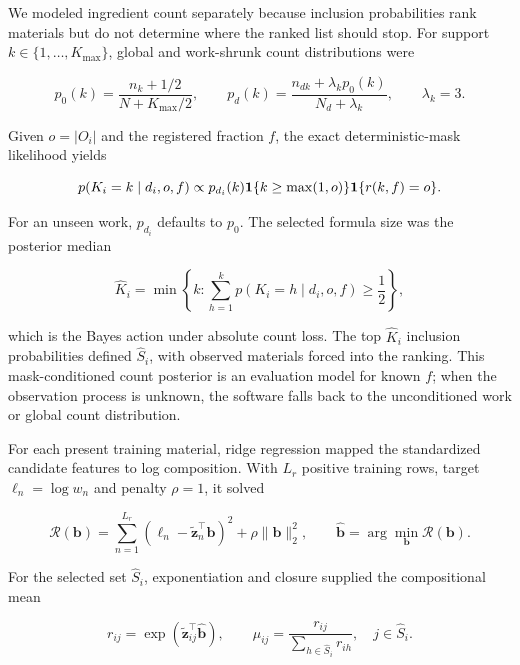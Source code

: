\documentclass[11pt]{article}
\begin{document}
We modeled ingredient count separately because inclusion probabilities rank materials but do not determine where the ranked list should stop. For support \(k\in\{1,\ldots,K_{\max}\}\), global and work-shrunk count distributions were

\begin{equation}
\label{eq:count-priors}
p_0(k)=\frac{n_k+1/2}{N+K_{\max}/2},\qquad p_d(k)=\frac{n_{dk}+\lambda_k p_0(k)}{N_d+\lambda_k},\qquad \lambda_k=3.
\end{equation}

Given \(o=|O_i|\) and the registered fraction \(f\), the exact deterministic-mask likelihood yields

\begin{equation}
\label{eq:count-posterior}
p(K_i=k\mid d_i,o,f)\propto p_{d_i}(k){\bf1}\{k\ge\max(1,o)\}{\bf1}\{r(k,f)=o\}.
\end{equation}

For an unseen work, \(p_{d_i}\) defaults to \(p_0\). The selected formula size was the posterior median

\begin{equation}
\label{eq:count-decision}
\widehat K_i=\min\left\{k:\sum_{h=1}^{k}p(K_i=h\mid d_i,o,f)\ge\frac{1}{2}\right\},
\end{equation}

which is the Bayes action under absolute count loss. The top \(\widehat K_i\) inclusion probabilities defined \(\widehat S_i\), with observed materials forced into the ranking. This mask-conditioned count posterior is an evaluation model for known \(f\); when the observation process is unknown, the software falls back to the unconditioned work or global count distribution.

For each present training material, ridge regression mapped the standardized candidate features to log composition. With \(L_r\) positive training rows, target \(\ell_n=\log w_n\) and penalty \(\rho=1\), it solved

\begin{equation}
\label{eq:ratio-ridge}
\mathcal R(\mathbf b)=\sum_{n=1}^{L_r}(\ell_n-\widetilde{\mathbf z}_n^{\top}\mathbf b)^2+\rho\|\mathbf b\|_2^2,\qquad \widehat{\mathbf b}=\arg\min_{\mathbf b}\mathcal R(\mathbf b).
\end{equation}

For the selected set \(\widehat S_i\), exponentiation and closure supplied the compositional mean

\begin{equation}
\label{eq:ratio-closure}
r_{ij}=\exp(\widetilde{\mathbf z}_{ij}^{\top}\widehat{\mathbf b}),\qquad \mu_{ij}=\frac{r_{ij}}{\sum_{h\in\widehat S_i}r_{ih}},\quad j\in\widehat S_i.
\end{equation}
\end{document}
